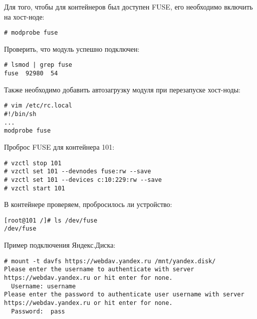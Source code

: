 Для того, чтобы для контейнеров был доступен FUSE, его необходимо включить на хост-ноде:
\begin{lstlisting}
# modprobe fuse
\end{lstlisting}

Проверить, что модуль успешно подключен:
\begin{lstlisting}
# lsmod | grep fuse
fuse  92980  54
\end{lstlisting}

Также необходимо добавить автозагрузку модуля при перезапуске хост-ноды:
\begin{lstlisting}
# vim /etc/rc.local
#!/bin/sh
...
modprobe fuse
\end{lstlisting}

Проброс FUSE для контейнера 101:
\begin{lstlisting}
# vzctl stop 101
# vzctl set 101 --devnodes fuse:rw --save
# vzctl set 101 --devices c:10:229:rw --save
# vzctl start 101
\end{lstlisting}

В контейнере проверяем, пробросилось ли устройство:
\begin{lstlisting}
[root@101 /]# ls /dev/fuse
/dev/fuse
\end{lstlisting}

Пример подключения Яндекс.Диска:
\begin{lstlisting}
# mount -t davfs https://webdav.yandex.ru /mnt/yandex.disk/
Please enter the username to authenticate with server
https://webdav.yandex.ru or hit enter for none.
  Username: username
Please enter the password to authenticate user username with server
https://webdav.yandex.ru or hit enter for none.
  Password:  pass
\end{lstlisting}

\clearpage
